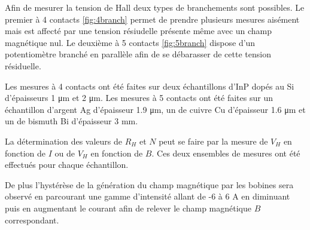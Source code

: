 \begin{minipage}{\textwidth}
    Afin de mesurer la tension de Hall deux types de branchements sont possibles. Le premier à 4 contacts \autoref{fig:4branch} permet de prendre plusieurs mesures aisément mais est affecté par une tension résiudelle présente même avec un champ magnétique nul. Le deuxième à 5 contacts \autoref{fig:5branch} dispose d'un potentiomètre branché en parallèle afin de se débarasser de cette tension résiduelle. 
    
    Les mesures à 4 contacts ont été faites sur deux échantillons d'InP dopés au Si d'épaisseurs 1 \si{\micro\meter} et 2 \si{\micro\meter}. Les mesures à 5 contacts ont été faites sur un échantillon d'argent Ag d'épaisseur 1.9 \si{\micro \meter}, un de cuivre Cu d'épaisseur 1.6 \si{\micro \meter} et un de bismuth Bi d'épaisseur 3 \si{\milli \meter}.

    La détermination des valeurs de \(R_H\) et \(N\) peut se faire par la mesure de \(V_H\) en fonction de \(I\) ou de \(V_H\) en fonction de \(B\). Ces deux ensembles de mesures ont été effectués pour chaque échantillon.
    
    De plus l'hystérèse de la génération du champ magnétique par les bobines sera observé en parcourant une gamme d'intensité allant de -6 à 6 \si{\ampere} en diminuant puis en augmentant le courant afin de relever le champ magnétique \(B\) correspondant.
    
\end{minipage}